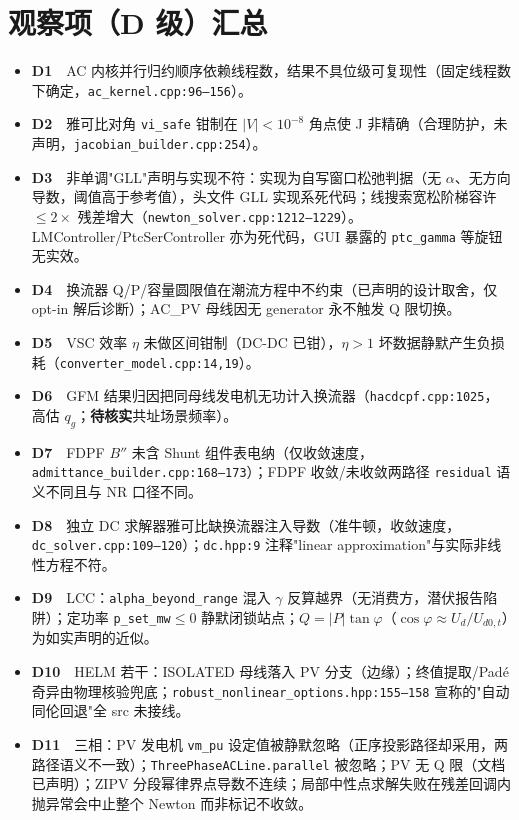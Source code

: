 \documentclass[11pt,a4paper,fontset=fandol]{ctexart}
\newcommand{\file}[1]{\texttt{#1}}
\begin{document}
\section{观察项（D 级）汇总}
\label{sec:obs}

\begin{itemize}
  \item \textbf{D1}　AC 内核并行归约顺序依赖线程数，结果不具位级可复现性（固定线程数下确定，\file{ac\_kernel.cpp:96--156}）。
  \item \textbf{D2}　雅可比对角 \texttt{vi\_safe} 钳制在 $|V|<10^{-8}$ 角点使 J 非精确（合理防护，未声明，\file{jacobian\_builder.cpp:254}）。
  \item \textbf{D3}　非单调"GLL"声明与实现不符：实现为自写窗口松弛判据（无 $\alpha$、无方向导数，阈值高于参考值），头文件 GLL 实现系死代码；线搜索宽松阶梯容许 $\le 2\times$ 残差增大（\file{newton\_solver.cpp:1212--1229}）。LMController/PtcSerController 亦为死代码，GUI 暴露的 \texttt{ptc\_gamma} 等旋钮无实效。
  \item \textbf{D4}　换流器 Q/P/容量圆限值在潮流方程中不约束（已声明的设计取舍，仅 opt-in 解后诊断）；AC\_PV 母线因无 generator 永不触发 Q 限切换。
  \item \textbf{D5}　VSC 效率 $\eta$ 未做区间钳制（DC-DC 已钳），$\eta>1$ 坏数据静默产生负损耗（\file{converter\_model.cpp:14,19}）。
  \item \textbf{D6}　GFM 结果归因把同母线发电机无功计入换流器（\file{hacdcpf.cpp:1025}，高估 $q_g$；\textbf{待核实}共址场景频率）。
  \item \textbf{D7}　FDPF $B''$ 未含 Shunt 组件表电纳（仅收敛速度，\file{admittance\_builder.cpp:168--173}）；FDPF 收敛/未收敛两路径 \texttt{residual} 语义不同且与 NR 口径不同。
  \item \textbf{D8}　独立 DC 求解器雅可比缺换流器注入导数（准牛顿，收敛速度，\file{dc\_solver.cpp:109--120}）；\file{dc.hpp:9} 注释"linear approximation"与实际非线性方程不符。
  \item \textbf{D9}　LCC：\texttt{alpha\_beyond\_range} 混入 $\gamma$ 反算越界（无消费方，潜伏报告陷阱）；定功率 \texttt{p\_set\_mw}$\le 0$ 静默闭锁站点；$Q=|P|\tan\varphi$（$\cos\varphi\approx U_d/U_{d0,t}$）为如实声明的近似。
  \item \textbf{D10}　HELM 若干：ISOLATED 母线落入 PV 分支（边缘）；终值提取/Padé 奇异由物理核验兜底；\texttt{robust\_nonlinear\_options.hpp:155--158} 宣称的"自动同伦回退"全 src 未接线。
  \item \textbf{D11}　三相：PV 发电机 \texttt{vm\_pu} 设定值被静默忽略（正序投影路径却采用，两路径语义不一致）；\texttt{ThreePhaseACLine.parallel} 被忽略；PV 无 Q 限（文档已声明）；ZIPV 分段幂律界点导数不连续；局部中性点求解失败在残差回调内抛异常会中止整个 Newton 而非标记不收敛。

\end{itemize}
\end{document}
